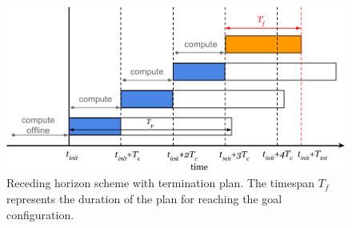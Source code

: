 \begin{figure}[!h]
  \centering
  \includegraphics[width=\linewidth]{./images/receding_horizon/recedinghorizon2.png} %
  \caption{Receding horizon scheme with termination plan. The timespan $T_f$ represents the duration of the plan for reaching the goal configuration.\label{fig:recedinghor}}
\end{figure}

